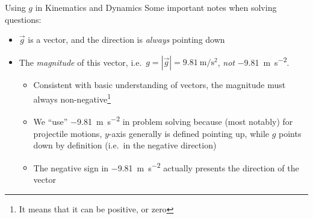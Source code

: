 \documentclass[12pt,compress,aspectratio=169]{beamer}
\newcommand{\eq}[2]{
  \vspace{#1}{\large\begin{displaymath}#2\end{displaymath}}
}
\begin{document}
\begin{frame}{Using $g$ in Kinematics and Dynamics}
  Some important notes when solving questions:
  \begin{itemize}
  \item $\vec g$ is a vector, and the direction is \emph{always} pointing down
  \item The \emph{magnitude} of this vector, i.e.\
    $g=|\vec g|=\SI{9.81}{\metre\per\second\squared}$, \emph{not}
    \SI{-9.81}{\metre\per\second\squared}.
    \begin{itemize}
    \item Consistent with basic understanding of vectors, the magnitude must
      always non-negative\footnote{It means that it can be positive, or zero}
    \item We ``use'' \SI{-9.81}{\metre\per\second\squared} in problem solving
      because (most notably) for projectile motions, $y$-axis generally is
      defined pointing up, while $g$ points down by definition (i.e.\ in the
      negative direction)
    \item The negative sign in \SI{-9.81}{\metre\per\second\squared}
      actually presents the direction of the vector
    \end{itemize}
  \end{itemize}
%
%
%
%  
%
\end{frame}
\end{document}
